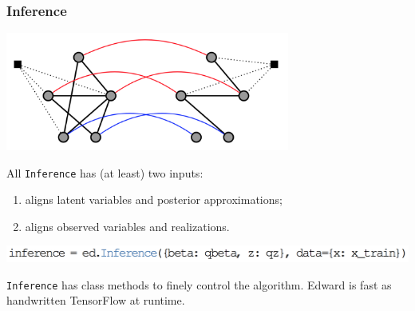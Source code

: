 \documentclass[10pt,
               xcolor={usenames,dvipsnames},
               hyperref={colorlinks,linktoc=all,citecolor=Plum,linkcolor=MidnightBlue,urlcolor=MidnightBlue},noamssymb]{beamer}
\begin{document}
\begin{frame}
\frametitle{Inference}

\begin{center}
\includegraphics[width=0.7\textwidth]{img/inference-graph.png}
\end{center}

All \texttt{Inference} has (at least) two inputs: \\
\begin{enumerate}
\vspace{-3ex}
\item
{} aligns latent variables and posterior approximations;
\item
{} aligns observed variables and realizations.
\end{enumerate}

\begin{center}
\vspace{-2.0ex}
\includegraphics[height=0.05\textheight]{img/inference.png}
\end{center}

\texttt{Inference} has class methods to finely control the algorithm.
Edward is fast as handwritten TensorFlow at runtime.
\end{frame}
\end{document}
